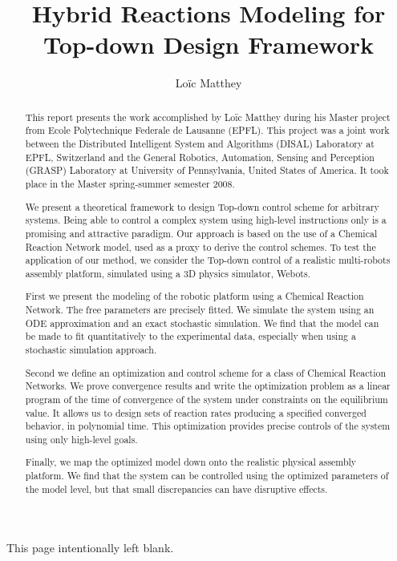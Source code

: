 \documentclass[letter,11pt,oneside]{report}
\title{Hybrid Reactions Modeling for Top-down Design Framework}
\author{Lo\"ic Matthey}
\begin{document}
\maketitle
\clearpage

\pagebreak
\thispagestyle{empty}
\begin{center}\tiny \sc This page intentionally left blank.\end{center}



\begin{abstract}
	This report presents the work accomplished by Lo\"ic Matthey during his Master project from Ecole Polytechnique Federale de Lausanne (EPFL). This project was a joint work between the Distributed Intelligent System and Algorithms (DISAL) Laboratory at EPFL, Switzerland and the General Robotics, Automation, Sensing and Perception (GRASP) Laboratory at University of Pennsylvania, United States of America. It took place in the Master spring-summer semester 2008.

	We present a theoretical framework to design Top-down control scheme for arbitrary systems. Being able to control a complex system using high-level instructions only is a promising and attractive paradigm. Our approach is based on the use of a Chemical Reaction Network model, used as a proxy to derive the control schemes. To test the application of our method, we consider the Top-down control of a realistic multi-robots assembly platform, simulated using a 3D physics simulator, Webots.
	
	First we present the modeling of the robotic platform using a Chemical Reaction Network. The free parameters are precisely fitted. We simulate the system using an ODE approximation and an exact stochastic simulation. We find that the model can be made to fit quantitatively to the experimental data, especially when using a stochastic simulation approach.
	
	Second we define an optimization and control scheme for a class of Chemical Reaction Networks. We prove convergence results and write the optimization problem as a linear program of the time of convergence of the system under constraints on the equilibrium value. It allows us to design sets of reaction rates producing a specified converged behavior, in polynomial time. This optimization provides precise controls of the system using only high-level goals.
	
	Finally, we map the optimized model down onto the realistic physical assembly platform. We find that the system can be controlled using the optimized parameters of the model level, but that small discrepancies can have disruptive effects.

\end{abstract}
\end{document}
